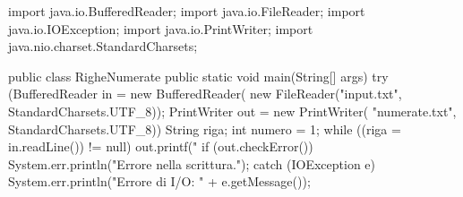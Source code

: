 \begin{unipdcode}[language=Java]
import java.io.BufferedReader;
import java.io.FileReader;
import java.io.IOException;
import java.io.PrintWriter;
import java.nio.charset.StandardCharsets;

public class RigheNumerate {
    public static void main(String[] args) {
        try (BufferedReader in = new BufferedReader(
                new FileReader("input.txt", StandardCharsets.UTF_8));
             PrintWriter out = new PrintWriter(
                "numerate.txt", StandardCharsets.UTF_8)) {
            String riga;
            int numero = 1;
            while ((riga = in.readLine()) != null) {
                out.printf("%
            }
            if (out.checkError()) {
                System.err.println("Errore nella scrittura.");
            }
        } catch (IOException e) {
            System.err.println("Errore di I/O: " + e.getMessage());
        }
    }
}
\end{unipdcode}
